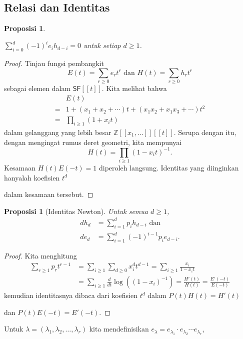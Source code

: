 \documentclass[12pt]{article}
\theoremstyle{plain}
\newtheorem{proposition}[theorem]{Proposisi}
\theoremstyle{definition}
\theoremstyle{remark}
\numberwithin{equation}{section}
\begin{document}
\subsection{Relasi dan Identitas}
\begin{proposition} \label{prop:fund_rel}

$\displaystyle\sum_{i=0}^d (-1)^i e_i h_{d-i}=0$ untuk setiap $d \ge 1$.
\end{proposition}
\begin{proof}
Tinjau fungsi pembangkit
\[ E(t) = \sum_{r \ge 0} e_r t^r
\textrm{ dan }
H(t) = \sum_{r \ge 0} h_r t^r \]
sebagai elemen dalam $\mathsf{SF}[[t]]$.
Kita melihat bahwa
\begin{align*}
& E(t)\\
 =& 1 + (x_1+x_2+\cdots)t
+ (x_1x_2+x_1x_3+\cdots)t^2 \\
=&\prod_{i \ge 1} (1+x_i t)
\end{align*}
dalam gelanggang yang lebih besar $\mathbb{Z}[[x_1,\ldots]][[t]]$.
Serupa dengan itu, dengan mengingat rumus deret geometri, kita mempunyai
\[
H(t) = \prod_{i \ge 1} (1-x_i t)^{-1} .
\]
Kesamaan $H(t)E(-t)=1$ diperoleh langsung.
Identitas yang diinginkan hanyalah koefisien $t^d$

dalam kesamaan tersebut.
\end{proof}
\begin{proposition}[Identitas Newton] Untuk semua $d \ge 1$,
\begin{align*}
dh_d&=\sum_{i=1}^d p_i h_{d-i} \textrm{ dan} \\ 
de_d&=\sum_{i=1}^d (-1)^{i-1} p_i e_{d-i}.
\end{align*}

\end{proposition}
\begin{proof}
Kita menghitung
\begin{align*}
\sum_{r \ge 1} p_r t^{r-1}
&= \sum_{i \ge 1} \sum_{d \ge 0} x_i^d t^{d-1}
= \sum_{i \ge 1} \frac{x_i}{1-x_it}\\
&= \sum_{i \ge 1} \frac{d}{dt}\log\left(
\left(1-x_i\right)^{-1}\right)
= \frac{H'(t)}{H(t)} = \frac{E'(-t)}{E(-t)}
\end{align*}
kemudian identitasnya dibaca dari
koefisien $t^d$ dalam $P(t)H(t)=H'(t)$

dan $P(t)E(-t)=E'(-t)$.
\end{proof}
Untuk $\lambda=(\lambda_1,\lambda_2,\ldots,\lambda_r)$ kita mendefinisikan
$e_\lambda = e_{\lambda_1}\cdot e_{\lambda_2} \cdots e_{\lambda_r}$,
\end{document}
